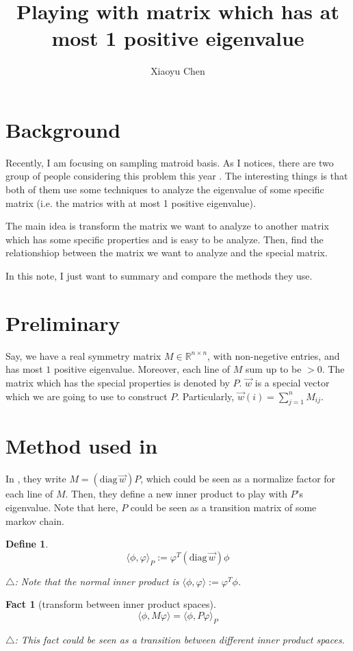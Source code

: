 \documentclass{article}
\title{Playing with matrix which has at most 1 positive eigenvalue}
\author{Xiaoyu Chen}
\date{}
\newtheorem{define}{Define}[section]
\newtheorem{fact}{Fact}[section]
\def\diag#1{(\mathrm{diag}\,#1)}
\def\<{\langle}
\def\>{\rangle}
\begin{document}
\maketitle
\section{Background}
Recently, I am focusing on sampling matroid basis.
As I notices, there are two group of people considering this problem this year \cite{anari2019log}\cite{cryan2019modified}.
The interesting things is that both of them use some techniques to analyze the eigenvalue of some specific matrix (i.e. the matrics with at most 1 positive eigenvalue).

The main idea is transform the matrix we want to analyze to another matrix which has some specific properties and is easy to be analyze.
Then, find the relationshiop between the matrix we want to analyze and the special matrix.

In this note, I just want to summary and compare the methods they use.


\section{Preliminary}
Say, we have a real symmetry matrix $M \in \mathbb{R}^{n\times n}$, with non-negetive entries, and has most $1$ positive eigenvalue.
Moreover, each line of $M$ sum up to be $> 0$.
The matrix which has the special properties is denoted by $P$.
$\vec{w}$ is a special vector which we are going to use to construct $P$.
Particularly, $\vec{w}(i) = \sum_{j=1}^n M_{ij}$.

\section{Method used in \cite{anari2019log}}
In \cite{anari2019log}, they write $M = \diag{\vec{w}}P$, which could be seen as a normalize factor for each line of $M$.
Then, they define a new inner product to play with $P$'s eigenvalue.
Note that here, $P$ could be seen as a transition matrix of some markov chain.
\begin{define}
  \[\<\phi, \varphi\>_P := \varphi^T \diag{\vec{w}} \phi\]

  $\triangle$: Note that the normal inner product is $\<\phi, \varphi\> := \varphi^T\phi$.
\end{define}

\begin{fact}[transform between inner product spaces]
  \label{fact:trans}
  \[\<\phi, M\varphi\> = \<\phi, P\varphi\>_P\]

  $\triangle$: This fact could be seen as a transition between different inner product spaces.
\end{fact}
\end{document}
